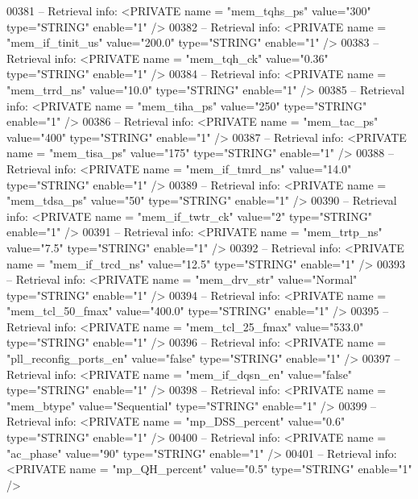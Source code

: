\begin{DoxyCode}
{00381 \textcolor{keyword}{-- Retrieval info:      <PRIVATE name = "mem\_tqhs\_ps" value="300"  type="STRING"  enable="1" />}
00382 \textcolor{keyword}{-- Retrieval info:      <PRIVATE name = "mem\_if\_tinit\_us" value="200.0"  type="STRING"  enable="1" />}
00383 \textcolor{keyword}{-- Retrieval info:      <PRIVATE name = "mem\_tqh\_ck" value="0.36"  type="STRING"  enable="1" />}
00384 \textcolor{keyword}{-- Retrieval info:      <PRIVATE name = "mem\_trrd\_ns" value="10.0"  type="STRING"  enable="1" />}
00385 \textcolor{keyword}{-- Retrieval info:      <PRIVATE name = "mem\_tiha\_ps" value="250"  type="STRING"  enable="1" />}
00386 \textcolor{keyword}{-- Retrieval info:      <PRIVATE name = "mem\_tac\_ps" value="400"  type="STRING"  enable="1" />}
00387 \textcolor{keyword}{-- Retrieval info:      <PRIVATE name = "mem\_tisa\_ps" value="175"  type="STRING"  enable="1" />}
00388 \textcolor{keyword}{-- Retrieval info:      <PRIVATE name = "mem\_if\_tmrd\_ns" value="14.0"  type="STRING"  enable="1" />}
00389 \textcolor{keyword}{-- Retrieval info:      <PRIVATE name = "mem\_tdsa\_ps" value="50"  type="STRING"  enable="1" />}
00390 \textcolor{keyword}{-- Retrieval info:      <PRIVATE name = "mem\_if\_twtr\_ck" value="2"  type="STRING"  enable="1" />}
00391 \textcolor{keyword}{-- Retrieval info:      <PRIVATE name = "mem\_trtp\_ns" value="7.5"  type="STRING"  enable="1" />}
00392 \textcolor{keyword}{-- Retrieval info:      <PRIVATE name = "mem\_if\_trcd\_ns" value="12.5"  type="STRING"  enable="1" />}
00393 \textcolor{keyword}{-- Retrieval info:      <PRIVATE name = "mem\_drv\_str" value="Normal"  type="STRING"  enable="1" />}
00394 \textcolor{keyword}{-- Retrieval info:      <PRIVATE name = "mem\_tcl\_50\_fmax" value="400.0"  type="STRING"  enable="1" />}
00395 \textcolor{keyword}{-- Retrieval info:      <PRIVATE name = "mem\_tcl\_25\_fmax" value="533.0"  type="STRING"  enable="1" />}
00396 \textcolor{keyword}{-- Retrieval info:      <PRIVATE name = "pll\_reconfig\_ports\_en" value="false"  type="STRING"  enable="1" />}
00397 \textcolor{keyword}{-- Retrieval info:      <PRIVATE name = "mem\_if\_dqsn\_en" value="false"  type="STRING"  enable="1" />}
00398 \textcolor{keyword}{-- Retrieval info:      <PRIVATE name = "mem\_btype" value="Sequential"  type="STRING"  enable="1" />}
00399 \textcolor{keyword}{-- Retrieval info:      <PRIVATE name = "mp\_DSS\_percent" value="0.6"  type="STRING"  enable="1" />}
00400 \textcolor{keyword}{-- Retrieval info:      <PRIVATE name = "ac\_phase" value="90"  type="STRING"  enable="1" />}
00401 \textcolor{keyword}{-- Retrieval info:      <PRIVATE name = "mp\_QH\_percent" value="0.5"  type="STRING"  enable="1" />}
}
\end{DoxyCode}
